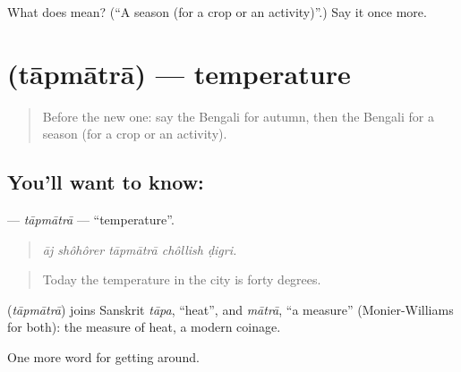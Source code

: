 \begin{tcolorbox}[breakable,colback=teal!4,colframe=teal!35!black,title={Before you move on}]
What does  mean? (\textquotedblleft{}A season (for a crop or an activity)\textquotedblright{}.) Say it once more.
\end{tcolorbox}
\section[\texorpdfstring{\bn{তাপমাত্রা} (tāpmātrā)}{তাপমাত্রা (tāpmātrā)}]{ (tāpmātrā) — temperature}

\label{lesson:BN-C427-tapmatra}



\begin{quote}
Before the new one: say the Bengali for autumn, then the Bengali for a season (for a crop or an activity).
\end{quote}

\subsection*{You'll want to know: }
\textbf{} — \emph{tāpmātrā} — \textquotedblleft{}temperature\textquotedblright{}.

\begin{quote}
    
\end{quote}

\begin{quote}
\emph{āj shôhôrer tāpmātrā chôllish ḍigri.}
\end{quote}

\begin{quote}
Today the temperature in the city is forty degrees.
\end{quote}

\begin{cousinweb}
\textbf{} (\emph{tāpmātrā}) joins Sanskrit \emph{tāpa}, \textquotedblleft{}heat\textquotedblright{}, and \emph{mātrā}, \textquotedblleft{}a measure\textquotedblright{} (Monier-Williams for both): the measure of heat, a modern coinage.
\end{cousinweb}

\begin{grammarlens}[title={What you've built}]
One more word for getting around.
\end{grammarlens}

